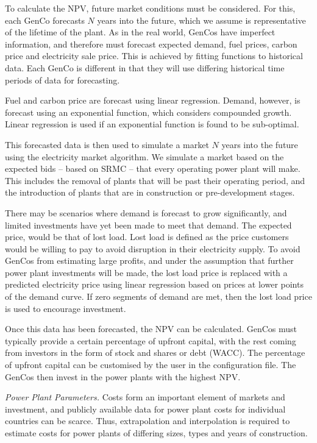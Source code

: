 To calculate the NPV, future market conditions must be considered. For this, each GenCo forecasts $N$ years into the future, which we assume is representative of the lifetime of the plant. As in the real world, GenCos have imperfect information, and therefore must forecast expected demand, fuel prices, carbon price and electricity sale price. This is achieved by fitting functions to historical data. Each GenCo is different in that they will use differing historical time periods of data for forecasting.

Fuel and carbon price are forecast using linear regression. Demand, however, is forecast using an exponential function, which considers compounded growth. Linear regression is used if an exponential function is found to be sub-optimal.

This forecasted data is then used to simulate a market $N$ years into the future using the electricity market algorithm. We simulate a market based on the expected bids -- based on SRMC -- that every operating power plant will make. This includes the removal of plants that will be past their operating period, and the introduction of plants that are in construction or pre-development stages. 

There may be scenarios where demand is forecast to grow significantly, and limited investments have yet been made to meet that demand. The expected price, would be that of lost load. Lost load is defined as the price customers would be willing to pay to avoid disruption in their electricity supply. To avoid GenCos from estimating large profits, and under the assumption that further power plant investments will be made, the lost load price is replaced with a predicted electricity price using linear regression based on prices at lower points of the demand curve. If zero segments of demand are met, then the  lost load price is used to encourage investment. 

Once this data has been forecasted\vphantom{Once expected fuel prices, carbon price, discount rate, and expected sale price of electricity are all forecast}, the NPV can be calculated. GenCos must typically provide a certain percentage of upfront capital, with the rest coming from investors in the form of stock and shares or debt (WACC). The percentage of upfront capital can be customised by the user in the configuration file. The GenCos then invest in the power plants with the highest NPV. 


\textit{Power Plant Parameters.}\label{ssssec:powerplantparameters} Costs form an important element of markets and investment, and publicly available data for power plant costs for individual countries can be scarce. Thus, extrapolation and interpolation is required to estimate costs for power plants of differing sizes, types and years of construction.

